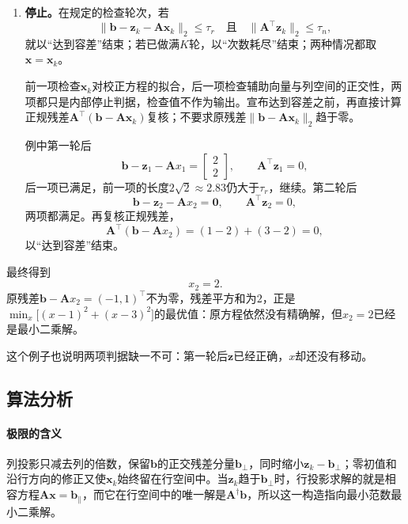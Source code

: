 \begin{enumerate}
 例中第二轮的列内积为$-1+1=0$，所以
 \[
  \eta_1=0,\qquad \bm z_2=\bm z_1=\begin{bmatrix}-1\\1\end{bmatrix}.
 \]
 行投影读取$\bm z_1$，抽到第一行或第二行时分别得到
 \[
  \gamma_1=1-(-1)-0=2,\qquad \gamma_1=3-1-0=2 .
 \]
 两种情况都得到
 \[
  x_2=2 ,
 \]
 此后不再改变。

 \item \textbf{停止。}在规定的检查轮次，若
 \begin{equation}
  \lVert\bm b-\bm z_k-\bm A\bm x_k\rVert_2\leq\tau_r
  \quad\text{且}\quad
  \lVert\bm A^\top\bm z_k\rVert_2\leq\tau_n ,
  \label{eq:ls-extended-kaczmarz-stopping}
 \end{equation}
 就以“达到容差”结束；若已做满$K$轮，以“次数耗尽”结束；两种情况都取$\bm x=\bm x_k$。

 前一项检查$\bm x_k$对校正方程的拟合，后一项检查辅助向量与列空间的正交性，两项都只是内部停止判据，检查值不作为输出。宣布达到容差之前，再直接计算正规残差$\bm A^\top(\bm b-\bm A\bm x_k)$复核；不要求原残差$\lVert\bm b-\bm A\bm x_k\rVert_2$趋于零。

 例中第一轮后
 \[
  \bm b-\bm z_1-\bm A x_1=\begin{bmatrix}2\\2\end{bmatrix},\qquad \bm A^\top\bm z_1=0 ,
 \]
 后一项已满足，前一项的长度$2\sqrt2\approx2.83$仍大于$\tau_r$，继续。第二轮后
 \[
  \bm b-\bm z_2-\bm A x_2=\bm0,\qquad \bm A^\top\bm z_2=0 ,
 \]
 两项都满足。再复核正规残差，
 \[
  \bm A^\top(\bm b-\bm A x_2)=(1-2)+(3-2)=0 ,
 \]
 以“达到容差”结束。
\end{enumerate}

最终得到
\[
 x_2=2 .
\]
原残差$\bm b-\bm A x_2=(-1,1)^\top$不为零，残差平方和为$2$，正是$\min_x\bigl[(x-1)^2+(x-3)^2\bigr]$的最优值：原方程依然没有精确解，但$x_2=2$已经是最小二乘解。

这个例子也说明两项判据缺一不可：第一轮后$\bm z$已经正确，$x$却还没有移动。

\subsection{算法分析}

\paragraph{极限的含义}
列投影只减去列的倍数，保留$\bm b$的正交残差分量$\bm b_\perp$，同时缩小$\bm z_k-\bm b_\perp$；零初值和沿行方向的修正又使$\bm x_k$始终留在行空间中。当$\bm z_k$趋于$\bm b_\perp$时，行投影求解的就是相容方程$\bm A\bm x=\bm b_\parallel$，而它在行空间中的唯一解是$\bm A^\dagger\bm b$，所以这一构造指向最小范数最小二乘解。

